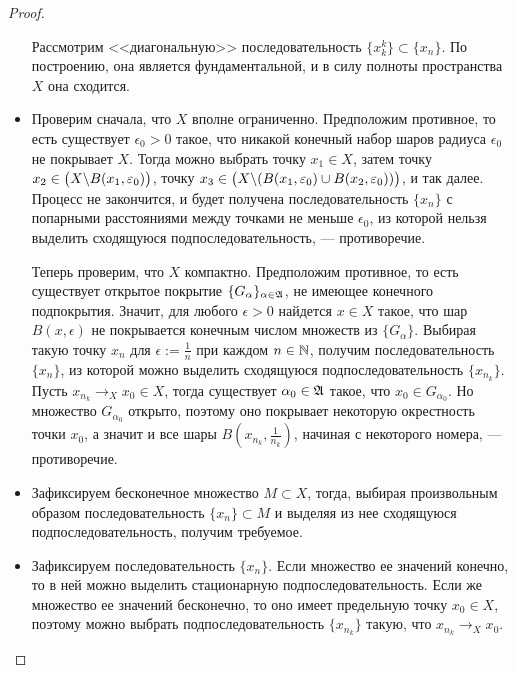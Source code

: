 \begin{proof}
\begin{itemize}
        Рассмотрим <<диагональную>> последовательность $\{x_k^k\} \subset \{x_n\}$. По построению, она является фундаментальной, и в силу полноты пространства $X$ она сходится.
        
        \item{}Проверим сначала, что $X$ вполне ограниченно. Предположим противное, то есть существует $\epsilon_0 > 0$ такое, что никакой конечный набор шаров радиуса $\epsilon_0$ не покрывает $X$. Тогда можно выбрать точку $x_1 \in X$, затем точку $x_2 \in \big(X \backslash B(x_1, \varepsilon_0)\big)$, точку $x_3 \in \big(X \backslash (B(x_1, \varepsilon_0) \cup B(x_2, \varepsilon_0))\big)$, и так далее. Процесс не закончится, и будет получена последовательность $\{x_n\}$ с попарными расстояниями между точками не меньше $\epsilon_0$, из которой нельзя выделить сходящуюся подпоследовательность, --- противоречие.
        
        Теперь проверим, что $X$ компактно. Предположим противное, то есть существует открытое покрытие $\{G_\alpha\}_{\alpha \in \mathfrak A}$, не имеющее конечного подпокрытия. Значит, для любого $\epsilon > 0$ найдется $x \in X$ такое, что шар $B(x, \epsilon)$ не покрывается конечным числом множеств из $\{G_\alpha\}$. Выбирая такую точку $x_n$ для $\epsilon := \frac 1n$ при каждом $n \in \mathbb{N}$, получим последовательность $\{x_n\}$, из которой можно выделить сходящуюся подпоследовательность $\{x_{n_k}\}$. Пусть $x_{n_k} \to_X x_0 \in X$, тогда существует $\alpha_0 \in \mathfrak A$ такое, что $x_0 \in G_{\alpha_0}$. Но множество $G_{\alpha_0}$ открыто, поэтому оно покрывает некоторую окрестность точки $x_0$, а значит и все шары $B(x_{n_k}, \frac1{n_k})$, начиная с некоторого номера, --- противоречие.
        
        \item{}Зафиксируем бесконечное множество $M \subset X$, тогда, выбирая произвольным образом последовательность $\{x_n\} \subset M$ и выделяя из нее сходящуюся подпоследовательность, получим требуемое.
        
        \item{}Зафиксируем последовательность $\{x_n\}$. Если множество ее значений конечно, то в ней можно выделить стационарную подпоследовательность. Если же множество ее значений бесконечно, то оно имеет предельную точку $x_0 \in X$, поэтому можно выбрать подпоследовательность $\{x_{n_k}\}$ такую, что $x_{n_k} \to_X x_0$.\qedhere
    \end{itemize}
\end{proof}

